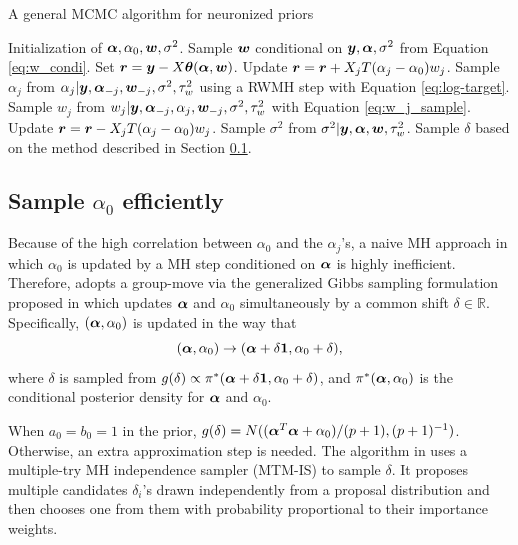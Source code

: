 \begin{algorithm}[H]
\caption{A general MCMC algorithm for neuronized priors} \label{alg:neu_MCMC}
\begin{algorithmic}
\Require Initialization of $\bm{\alpha},\alpha_0, \bm{w}, \sigma^2$.
\State Sample $\bm{w}$ conditional on $\bm{y}, \bm{\alpha}, \sigma^2$ from Equation \eqref{eq:w_condi}.
\State Set $\bm{r} = \bm{y} - X\bm{\theta}(\bm{\alpha},\bm{w})$.
\State Update $\bm{r} = \bm{r} + X_jT(\alpha_j-\alpha_0) w_j$.
\State Sample $\alpha_j$ from $\alpha_j | \bm{y}, \bm{\alpha}_{-j}, \bm{w}_{-j} ,\sigma^2, \tau_w^2$ using a RWMH step with Equation \eqref{eq:log-target}.
\State Sample $w_j$ from $w_j | \bm{y}, \bm{\alpha}_{-j},\alpha_j, \bm{w}_{-j}, \sigma^2, \tau_w^2 $ with Equation \eqref{eq:w_j_sample}.
\EndFor
\State Update $\bm{r} = \bm{r} - X_jT(\alpha_j-\alpha_0) w_j$.
\EndFor
\State Sample $\sigma^2$ from $\sigma^2 | \bm{y}, \bm{\alpha}, \bm{w}, \tau_w^2$.
\State Sample $\delta$ based on the method described in Section \ref{sec:samp_alpha0}.
\EndFor
\end{algorithmic}
\end{algorithm}

\subsection{Sample $\alpha_0$ efficiently} \label{sec:samp_alpha0}

Because of the high correlation between $\alpha_0$ and the $\alpha_j$’s, a naive MH approach in which $\alpha_0$ is updated by a MH step conditioned on $\bm{\alpha}$ is highly inefficient. Therefore, \citet{shin2021neuronized} adopts a group-move via the generalized Gibbs sampling formulation proposed in \cite{liu2000generalised} which updates $\bm{\alpha}$ and $\alpha_0$ simultaneously by a common shift $\delta \in \mathbb{R}$. Specifically, $(\bm{\alpha},\alpha_0)$ is updated in the way that
$$ (\bm{\alpha}, \alpha_0) \rightarrow (\bm{\alpha} + \delta \bm{1}, \alpha_0 + \delta),$$
where $\delta$ is sampled from $g(\delta) \propto \pi^*(\bm{\alpha} + \delta \bm{1}, \alpha_0 + \delta)$, and $\pi^*(\bm{\alpha}, \alpha_0)$ is the conditional posterior density for $\bm{\alpha}$ and $\alpha_0$. 

When $a_0 = b_0 = 1$ in the prior, $g(\delta) = N((\bm{\alpha}^T\bm{\alpha} + \alpha_0)/(p+1) , (p+1)^{-1})$. Otherwise, an extra approximation step is needed. The algorithm in \citep{shin2021neuronized} uses a multiple-try MH independence sampler (MTM-IS) to sample $\delta$. It proposes multiple candidates $\delta_i$'s drawn independently from a proposal distribution and then chooses one from them with probability proportional to their importance weights.

